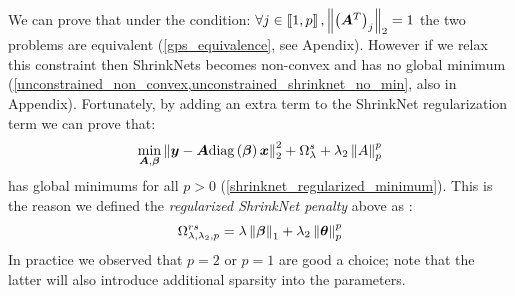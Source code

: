 We can prove that under the condition: $\forall j\in \left\llbracket1, p\right\rrbracket,
\left\lVert\left(\bm{A}^T\right)_j\right\rVert_2 = 1$ the two problems are equivalent
(\cref{gps_equivalence}, see Apendix). However if we relax this constraint then ShrinkNets
becomes non-convex and has no global minimum
(\cref{unconstrained_non_convex,unconstrained_shrinknet_no_min}, also in Appendix). Fortunately,
by adding an extra term to the ShrinkNet regularization term we can prove that:
%
\begin{equation}
  \min_{\bm{A}, \bm{\beta}} \left\lVert\bm{y} - \bm{A}\text{diag}\left(\bm{\beta}\right)\bm{x}\right\rVert_2^2 + \Omega_\lambda^s + \lambda_2\left\lVert A\right\rVert_p^p
\end{equation}
%
has global minimums for all $p>0$ (\cref{shrinknet_regularized_minimum}).
This is the reason we defined the \textit{regularized ShrinkNet penalty} above
as :
%
\begin{equation}
  \Omega_{\lambda, \lambda_2, p}^{rs} = \lambda\left\lVert\bm{\beta}\right\rVert_1 + \lambda_2\left\lVert\bm\theta\right\rVert_p^p
\end{equation}
%
In practice we observed that $p=2$ or $p=1$ are good a choice; note that the latter
will also introduce additional sparsity into the parameters. 


